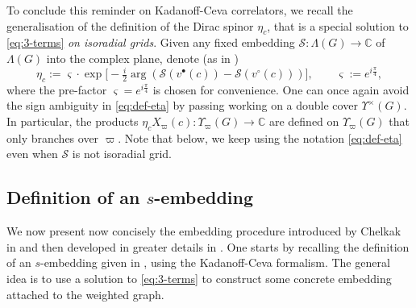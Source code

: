\documentclass[reqno]{amsart}
\numberwithin{equation}{section}
\theoremstyle{definition}
\theoremstyle{remark}
\newcommand\C{\mathbb{C}}
\newcommand\cS{\mathcal{S}}
\begin{document}
To conclude this reminder on Kadanoff-Ceva correlators, we recall the generalisation of the definition of the Dirac spinor $\eta_c $, that is a special solution to  \eqref{eq:3-terms} \emph{on isoradial grids}. Given any fixed  embedding $\cS:\Lambda(G)\to\C$ of $\Lambda(G)$ into the complex plane, denote (as in \cite{ChSmi2})
\begin{equation} \label{eq:def-eta}
\eta_c:=\varsigma\cdot \exp\big[-\tfrac{i}{2}\arg(\cS(v^\bullet(c))-\cS(v^\circ(c)))\big],\qquad \varsigma:=e^{i\frac{\pi}{4}},
\end{equation}
where the pre-factor $\varsigma=e^{i\frac\pi 4}$ is chosen for convenience. One can once again avoid the sign ambiguity in \eqref{eq:def-eta} by passing working on a double cover $\Upsilon^\times(G)$. In particular, the products $\eta_c X_\varpi(c):\Upsilon_\varpi(G)\to\C$ are  defined on $\Upsilon_\varpi(G)$ that only branches over $\varpi$. Note that below, we keep using the notation \eqref{eq:def-eta} even when $\cS$ is not isoradial grid.



\subsection{Definition of an $s$-embedding}\label{sub:semb-definition}

We now present now concisely the embedding procedure introduced by Chelkak in \cite[Section 6]{Ch-ICM18} and then developed in greater details in \cite{Che20}. One starts by recalling the definition of an $s$-embedding given in \cite[Definition 2.1]{Che20}, using the Kadanoff-Ceva formalism. The general idea is to use a solution to \eqref{eq:3-terms} to construct some concrete embedding attached to the weighted graph. 
\end{document}
